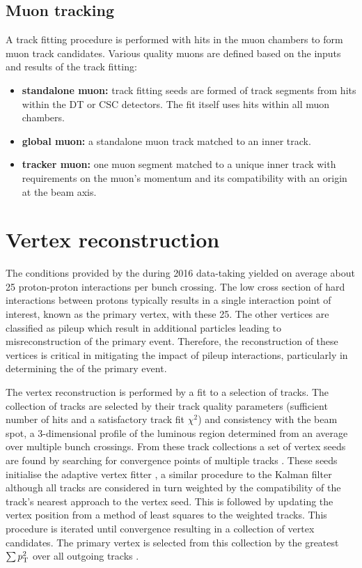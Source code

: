 \subsection{Muon tracking}\label{subsec:muon-tracking}

A track fitting procedure is performed with hits in the muon chambers to form
muon track candidates. Various quality muons are defined based on the inputs
and results of the track fitting:

\begin{itemize}
    \item \textbf{standalone muon:} track fitting seeds are formed of track
    segments from hits within the DT or CSC detectors. The fit itself uses
    hits within all muon chambers.
    \item \textbf{global muon:} a standalone muon track matched to an inner
    track.
    \item \textbf{tracker muon:} one muon segment matched to a unique inner
    track with requirements on the muon's momentum and its compatibility with
    an origin at the beam axis.
\end{itemize}


\section{Vertex reconstruction}\label{sec:vertex-reco}

The conditions provided by the \LHC during 2016 data-taking yielded on average
about 25 proton-proton interactions per bunch crossing. The low cross section of hard interactions between protons typically results in a single interaction point of interest, known as the primary vertex, with these 25. The
other vertices are classified as pileup which result in additional particles
leading to misreconstruction of the primary event. Therefore, the reconstruction
of these vertices is critical in mitigating the impact of pileup interactions,
particularly in determining the \ptmiss of the primary event.

The vertex reconstruction is performed by a fit to a selection of tracks. The
collection of tracks are selected by their track quality parameters
(sufficient number of hits and a satisfactory track fit $\chi^2$) and
consistency with the beam spot, a 3-dimensional profile of the luminous
region determined from an average over multiple bunch crossings. From these
track collections a set of vertex seeds are found by searching for convergence
points of multiple tracks \cite{Speer:927395}. These seeds initialise the
adaptive vertex fitter \cite{Fruhwirth:1027031}, a similar procedure to the
Kalman filter although all tracks are considered in turn weighted by the
compatibility of the track's nearest approach to the vertex seed. This is
followed by updating the vertex position from a method of least squares to the
weighted tracks. This procedure is iterated until convergence resulting in a
collection of vertex candidates. The primary vertex is selected from this
collection by the greatest $\sum p_{\text{T}}^2$ over all outgoing tracks
\cite{Sirunyan:2017ulk}.


